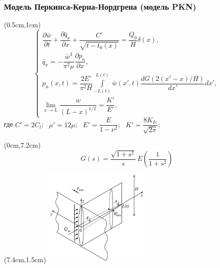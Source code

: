 \documentclass{beamer}
\begin{document}

\begin{frame}
\frametitle{Модель Перкинса-Керна-Нордгрена (модель PKN)}

\scriptsize

\begin{textblock*}{7cm}(0.5cm,1cm)
$$
\begin{cases}
\dfrac{\partial\bar{w}}{\partial t}+\dfrac{\partial\bar{q}_x}{\partial x}+\dfrac{C'}{\sqrt{t-t_0(x)}}=\dfrac{Q_0}{H}\delta(x),\\[15pt]
\bar{q}_x=-\dfrac{\bar{w}^3}{\pi^2\mu}\dfrac{\partial p_n}{\partial x},\\[15pt]
p_n(x,t)=\dfrac{2E'}{\pi^2H}\displaystyle\int\limits_{-L(t)}^{L(t)}\bar{w}(x',t)\dfrac{dG(2(x'-x)/H)}{dx'}dx',\\[22pt]
\displaystyle\lim_{x\to L}\dfrac{w}{(L-x)^{1/2}}=\dfrac{K'}{E'},
\end{cases}
$$
где $C'=2C_l$; $\,\,\,\mu'=12\mu$; $\,\,\,E'=\dfrac{E}{1-\nu^2}$; $\,\,\,K'=\dfrac{8K_{Ic}}{\sqrt{2\pi}}$;
\end{textblock*}

\begin{textblock*}{7cm}(0cm,7.2cm)
$$
G(s)=\frac{\sqrt{1+s^2}}{s}\,E\!\left(\frac{1}{1+s^2}\right)
$$
\end{textblock*}

\begin{textblock*}{7cm}(7.4cm,1.5cm)
\includegraphics[width=5.2cm]{pkn_model_3D.jpg}
\end{textblock*}


\end{frame}
\end{document}
